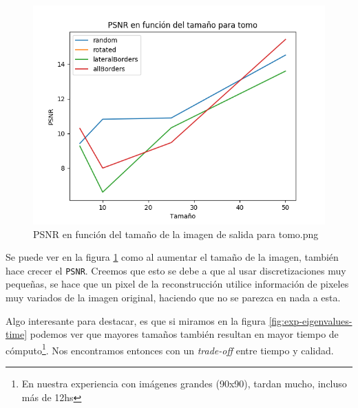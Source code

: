 \begin{figure}[H]
    \centering
    \includegraphics[width=\textwidth]{../graficos/size/tomo/noise_graph.png}
    \caption{PSNR en función del tamaño de la imagen de salida para tomo.png}
    \label{fig:exp-size-1}
\end{figure}

Se puede ver en la figura \ref{fig:exp-size-1} como al aumentar el tamaño de la imagen, también hace crecer el \verb|PSNR|.
Creemos que esto se debe a que al usar discretizaciones muy pequeñas,
se hace que un pixel de la reconstrucción utilice información
de pixeles muy variados de la imagen original,
haciendo que no se parezca en nada a esta.

Algo interesante para destacar, es que si miramos en la figura \ref{fig:exp-eigenvalues-time} podemos ver que mayores tamaños también resultan en
mayor tiempo de cómputo\footnote{En nuestra experiencia con imágenes grandes (90x90), tardan mucho, incluso más de 12hs}. 
Nos encontramos entonces con un \textit{trade-off} entre tiempo y calidad.
